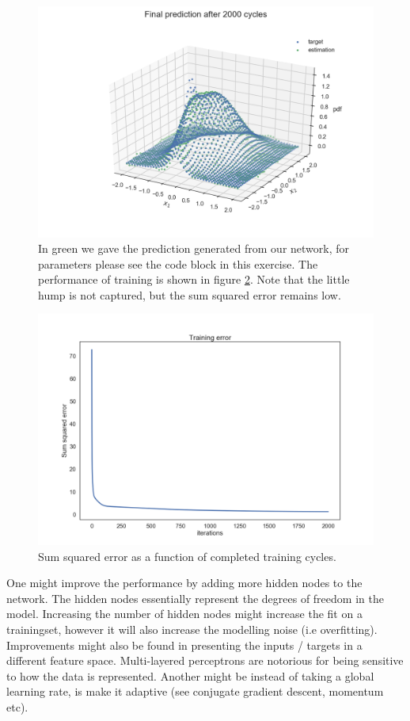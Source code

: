 \documentclass[11pt]{article}
\makeatletter
\def\maxwidth{\ifdim\Gin@nat@width>\linewidth\linewidth
    \else\Gin@nat@width\fi}
\let\Oldincludegraphics\includegraphics
\renewcommand{\includegraphics}[1]{\Oldincludegraphics[width=.8\maxwidth]{#1}}
\makeatother
\begin{document}
	\begin{figure}[H]
		\centering \includegraphics{../Figures/2.61}
		\caption{In green we gave the prediction generated from our network, for parameters please see the code block in this exercise. The performance of training is shown in figure \ref{fig:2.62}. Note that the little hump is not captured, but the sum squared error remains low.}
		\label{fig:2.61}
	\end{figure}

		\begin{figure}[H]
		\centering \includegraphics{../Figures/2.62}
		\caption{Sum squared error as a function of completed training cycles.}
		\label{fig:2.62}
	\end{figure}

    One might improve the performance by adding more hidden nodes to the
network. The hidden nodes essentially represent the degrees of freedom
in the model. Increasing the number of hidden nodes might increase the
fit on a trainingset, however it will also increase the modelling noise
(i.e overfitting). Improvements might also be found in presenting the
inputs / targets in a different feature space. Multi-layered perceptrons
are notorious for being sensitive to how the data is represented.
Another might be instead of taking a global learning rate, is make it
adaptive (see conjugate gradient descent, momentum etc).
\end{document}
